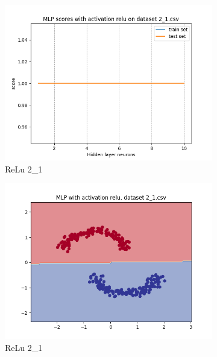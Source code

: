 \documentclass[12pt]{article}
\newcommand*{\subfigwidth}{0.24\textwidth}
\begin{document}
\begin{figure}[H]
\begin{subfigure}[t]{\subfigwidth}
    \end{subfigure}
    \hfill
    \begin{subfigure}[t]{\subfigwidth}
        \includegraphics[width=\linewidth]{img/exp_1/mlp/2_1/relu/scores.png}
        \caption{ReLu 2\_1}
    \end{subfigure}
    \hfill
    \begin{subfigure}[t]{\subfigwidth}
        \includegraphics[width=\linewidth]{img/exp_1/mlp/2_1/relu/boundary.png}
        \caption{ReLu 2\_1}
    \end{subfigure}
    \\
    \begin{subfigure}[t]{\subfigwidth}

\end{subfigure}
\end{figure}
\end{document}
